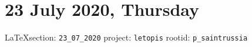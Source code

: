  
 

\clearpage
\section{23 July 2020, Thursday}
  
\vspace{0.5cm}
{\small\LaTeX section: \verb|23_07_2020| project: \verb|letopis| rootid: \verb|p_saintrussia|}
\vspace{0.5cm}

